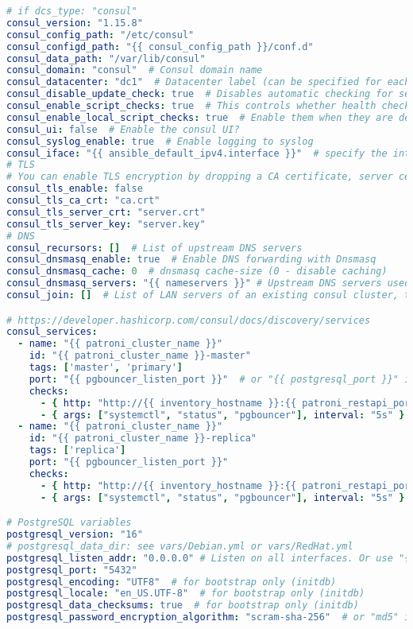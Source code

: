 \begin{flushleft}
\begin{lstlisting}[language=yaml, caption=Testsystem - Anhang - Maintenance - main.yml,captionpos=b,label={lst:testsystem-maintenance-main.yml},breaklines=true]
# if dcs_type: "consul"
consul_version: "1.15.8"
consul_config_path: "/etc/consul"
consul_configd_path: "{{ consul_config_path }}/conf.d"
consul_data_path: "/var/lib/consul"
consul_domain: "consul"  # Consul domain name
consul_datacenter: "dc1"  # Datacenter label (can be specified for each host in the inventory)
consul_disable_update_check: true  # Disables automatic checking for security bulletins and new version releases
consul_enable_script_checks: true  # This controls whether health checks that execute scripts are enabled on this agent
consul_enable_local_script_checks: true  # Enable them when they are defined in the local configuration files
consul_ui: false  # Enable the consul UI?
consul_syslog_enable: true  # Enable logging to syslog
consul_iface: "{{ ansible_default_ipv4.interface }}"  # specify the interface name with a Private IP (ex. "enp7s0")
# TLS
# You can enable TLS encryption by dropping a CA certificate, server certificate, and server key in roles/consul/files/
consul_tls_enable: false
consul_tls_ca_crt: "ca.crt"
consul_tls_server_crt: "server.crt"
consul_tls_server_key: "server.key"
# DNS
consul_recursors: []  # List of upstream DNS servers
consul_dnsmasq_enable: true  # Enable DNS forwarding with Dnsmasq
consul_dnsmasq_cache: 0  # dnsmasq cache-size (0 - disable caching)
consul_dnsmasq_servers: "{{ nameservers }}" # Upstream DNS servers used by dnsmasq
consul_join: []  # List of LAN servers of an existing consul cluster, to join.

# https://developer.hashicorp.com/consul/docs/discovery/services
consul_services:
  - name: "{{ patroni_cluster_name }}"
    id: "{{ patroni_cluster_name }}-master"
    tags: ['master', 'primary']
    port: "{{ pgbouncer_listen_port }}"  # or "{{ postgresql_port }}" if pgbouncer_install: false
    checks:
      - { http: "http://{{ inventory_hostname }}:{{ patroni_restapi_port }}/primary", interval: "2s" }
      - { args: ["systemctl", "status", "pgbouncer"], interval: "5s" }  # comment out this check if pgbouncer_install: false
  - name: "{{ patroni_cluster_name }}"
    id: "{{ patroni_cluster_name }}-replica"
    tags: ['replica']
    port: "{{ pgbouncer_listen_port }}"
    checks:
      - { http: "http://{{ inventory_hostname }}:{{ patroni_restapi_port }}/replica?lag={{ patroni_maximum_lag_on_replica }}", interval: "2s" }
      - { args: ["systemctl", "status", "pgbouncer"], interval: "5s" }

# PostgreSQL variables
postgresql_version: "16"
# postgresql_data_dir: see vars/Debian.yml or vars/RedHat.yml
postgresql_listen_addr: "0.0.0.0" # Listen on all interfaces. Or use "{{ inventory_hostname }},127.0.0.1" to listen on a specific IP address.
postgresql_port: "5432"
postgresql_encoding: "UTF8"  # for bootstrap only (initdb)
postgresql_locale: "en_US.UTF-8"  # for bootstrap only (initdb)
postgresql_data_checksums: true  # for bootstrap only (initdb)
postgresql_password_encryption_algorithm: "scram-sha-256"  # or "md5" if your clients do not work with passwords encrypted with SCRAM-SHA-256


\end{lstlisting}
\end{flushleft}
